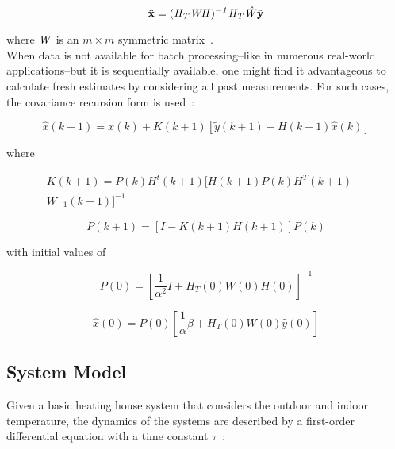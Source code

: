 \begin{equation}
    \bf{\hat{x}} = (\it{H}_{T} \it{W} \it{H})^{-1} \it{H}_{T} \hat{W} \bf{\tilde{y}}
\end{equation}

where $\it{W}$ is an $m \times m$ symmetric matrix~\cite{crassidis2004dynamic}. \\

When data is not available for batch processing--like in numerous real-world applications--but it is sequentially available, one might find it advantageous to calculate fresh estimates by considering all past measurements. For such cases, the covariance recursion form is used~\cite{crassidis2004dynamic}:

\begin{equation}
    \hat{x}(k + 1) = \hat{x}(k) + K(k + 1) \left[ \tilde{y}(k + 1) - H(k + 1) \hat{x}(k) \right]
    \label{eq:lse_recursion}
\end{equation}

where

\begin{equation}
    \begin{split}
        K(k + 1) = P(k) H^{t}(k + 1) [ H(k + 1) P(k) H^{T}(k + 1) +\\ W_{-1}(k + 1) ]^{-1}
    \end{split}
    \label{eq:lse_recursion_K}
\end{equation}

\begin{equation}
    P(k + 1) = \left[ I - K(k + 1) H(k + 1) \right] P(k)
    \label{eq:lse_recursion_P}
\end{equation}

with initial values of

\begin{equation}
    P(0) = \left[ \frac{1}{\alpha^{2}} I + H_{T}(0) W(0) H(0) \right]^{-1}
    \label{eq:lse_recursion_P0}
\end{equation}

\begin{equation}
    \hat{x}(0) = P(0) \left[ \frac{1}{\alpha} \beta + H_{T}(0) W(0) \hat{y}(0) \right]
    \label{eq:lse_recursion_x0}
\end{equation}


\subsection{System Model}
Given a basic heating house system that considers the outdoor and indoor temperature, the dynamics of the systems are described by a first-order differential equation with a time constant $\tau$~\cite{franklin1994dynsys}:

